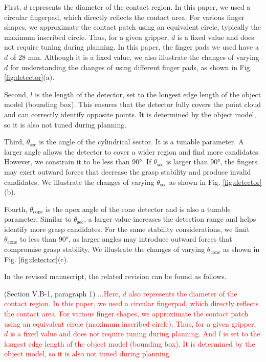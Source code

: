 \documentclass[journal]{IEEEtran}
\newcommand{\rev}[1]{\textcolor{red}{#1}}
\begin{document}
First, $d$ represents the diameter of the contact region. In this paper, we used a circular fingerpad, which directly reflects the contact area. For various finger shapes, we approximate the contact patch using an equivalent circle, typically the maximum inscribed circle. Thus, for a given gripper, $d$ is a fixed value and does not require tuning during planning. In this paper, the finger pads we used have a $d$ of 28 mm. Although it is a fixed value, we also illustrate the changes of varying $d$ for understanding the changes of using different finger pads, as shown in Fig. \ref{fig:detector}(a). 

Second, $l$ is the length of the detector, set to the longest edge length of the object model (bounding box). This ensures that the detector fully covers the point cloud and can correctly identify opposite points. It is determined by the object model, so it is also not tuned during planning.

Third, $\theta_\mathrm{sec}$ is the angle of the cylindrical sector. It is a tunable parameter. A larger angle allows the detector to cover a wider region and find more candidates. However, we constrain it to be less than 90°. If $\theta_\mathrm{sec}$ is larger than 90°, the fingers may exert outward forces that decrease the grasp stability and produce invalid candidates. We illustrate the changes of varying $\theta_\mathrm{sec}$ as shown in Fig. \ref{fig:detector}(b).

Fourth, $\theta_\mathrm{cone}$ is the apex angle of the cone detector and is also a tunable parameter. Similar to $\theta_\mathrm{sec}$, a larger value increases the detection range and helps identify more grasp candidates. For the same stability considerations, we limit $\theta_\mathrm{cone}$ to less than 90°, as larger angles may introduce outward forces that compromise grasp stability. We illustrate the changes of varying $\theta_\mathrm{cone}$ as shown in Fig. \ref{fig:detector}(c).

In the revised manuscript, the related revision can be found as follows.

(Section V.B-1, paragraph 1) ...\rev{Here, $d$ also represents the diameter of the contact region. In this paper, we used a circular fingerpad, which directly reflects the contact area. For various finger shapes, we approximate the contact patch using an equivalent circle (maximum inscribed circle). Thus, for a given gripper, $d$ is a fixed value and does not require tuning during planning. And $l$ is set to the longest edge length of the object model (bounding box). It is determined by the object model, so it is also not tuned during planning.}
\end{document}
